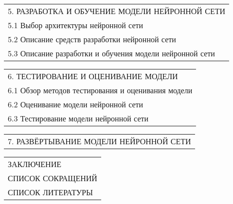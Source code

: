 \documentclass[12pt, А4, twoside]{article} %
\begin{document}
\begin{FlushLeft}
    \begin{tabular}{p{17.25cm}} 
        \textsf{5. РАЗРАБОТКА И ОБУЧЕНИЕ МОДЕЛИ НЕЙРОННОЙ СЕТИ} \vspace{1pt} \hline \\
        \hspace{0.3cm}\textsf{5.1 Выбор архитектуры нейронной сети} \vspace{1pt} \hline \\
        \hspace{0.3cm}\textsf{5.2 Описание средств разработки нейронной сети} \vspace{1pt} \hline \\
        \hspace{0.3cm}\textsf{5.3 Описание разработки и обучения модели нейронной сети} \vspace{1pt} \hline \\
    \end{tabular}  

    \begin{tabular}{p{17.25cm}} 
        \textsf{6. ТЕСТИРОВАНИЕ И ОЦЕНИВАНИЕ МОДЕЛИ} \vspace{1pt} \hline \\
        \hspace{0.5cm}\textsf{6.1 Обзор методов тестирования и оценивания модели} \vspace{1pt} \hline \\
        \hspace{0.5cm}\textsf{6.2 Оценивание модели нейронной сети} \vspace{1pt} \hline \\
        \hspace{0.5cm}\textsf{6.3 Тестирование модели нейронной сети} \vspace{1pt} \hline \\
    \end{tabular} 

    \begin{tabular}{p{17.25cm}} 
        \textsf{7. РАЗВЁРТЫВАНИЕ МОДЕЛИ НЕЙРОННОЙ СЕТИ} \vspace{1pt} \hline \\
    \end{tabular}  

    \begin{tabular}{p{17.25cm}} 
        \textsf{ЗАКЛЮЧЕНИЕ} \vspace{2pt} \hline \\
        \textsf{СПИСОК СОКРАЩЕНИЙ} \vspace{1pt} \hline \\
        \textsf{СПИСОК ЛИТЕРАТУРЫ} \vspace{2pt} \hline 
    \end{tabular} 


\end{FlushLeft}
\end{document}
